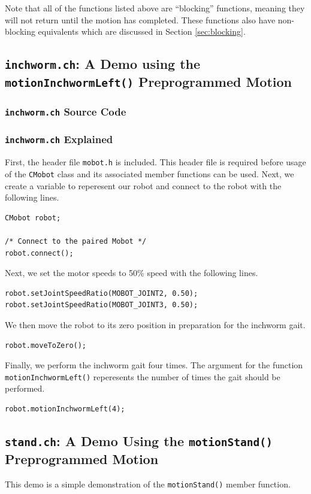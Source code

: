 \documentclass{article}
\begin{document}
Note that all of the functions listed above are ``blocking'' functions, meaning
they will not return until the motion has completed. These functions also
have non-blocking equivalents which are discussed in Section
\ref{sec:blocking}.

\subsection{\texttt{inchworm.ch}: A Demo using the \texttt{motionInchwormLeft()}
Preprogrammed Motion}
\subsubsection{\texttt{inchworm.ch} Source Code}

\subsubsection{\texttt{inchworm.ch} Explained}
First, the header file \texttt{mobot.h} is included. This header file
is required before usage of the \texttt{CMobot} class and its associated
member functions can be used. Next, we create a variable to reperesent our
robot and connect to the robot with the following lines.
\begin{verbatim}
CMobot robot;

/* Connect to the paired Mobot */
robot.connect();
\end{verbatim}

Next, we set the motor speeds to 50\% speed with the following lines.
\begin{verbatim}
robot.setJointSpeedRatio(MOBOT_JOINT2, 0.50);
robot.setJointSpeedRatio(MOBOT_JOINT3, 0.50);
\end{verbatim}

We then move the robot to its zero position in preparation for the 
inchworm gait.
\begin{verbatim}
robot.moveToZero();
\end{verbatim}

Finally, we perform the inchworm gait four times. The argument for the
function \texttt{motionInchwormLeft()} reperesents the number of times
the gait should be performed.
\begin{verbatim}
robot.motionInchwormLeft(4);
\end{verbatim}


\subsection{\texttt{stand.ch}: A Demo Using the \texttt{motionStand()} Preprogrammed
Motion}
This demo is a simple demonstration of the \texttt{motionStand()} member function.
\end{document}
